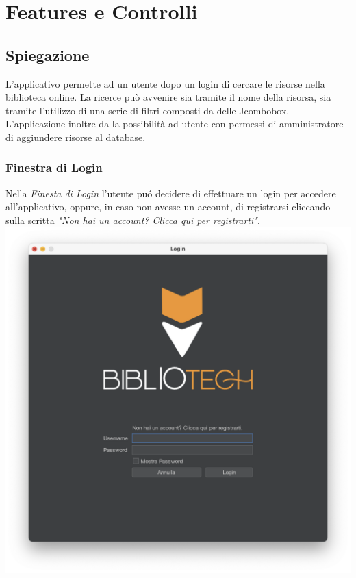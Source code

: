 \chapter{Features e Controlli}
 \section{Spiegazione}
 L'applicativo permette ad un utente dopo un login di cercare le risorse nella biblioteca online.
 La ricerce può avvenire sia tramite il nome della risorsa, sia tramite l'utilizzo di una serie di 
 filtri composti da delle Jcombobox.
 L'applicazione inoltre da la possibilità ad utente con permessi di amministratore di aggiundere risorse 
 al database.


 \subsection{Finestra di Login}
 Nella \textit{Finesta di Login} l'utente pu\'o decidere di effettuare un login per accedere all'applicativo, oppure,
 in caso non avesse un account, di registrarsi cliccando sulla scritta \textit{"Non hai un account? Clicca
 qui per registrarti"}.
 \includegraphics[scale=0.25, center]{Immagini/Schermate/Login_Register/LoginPage.png}

